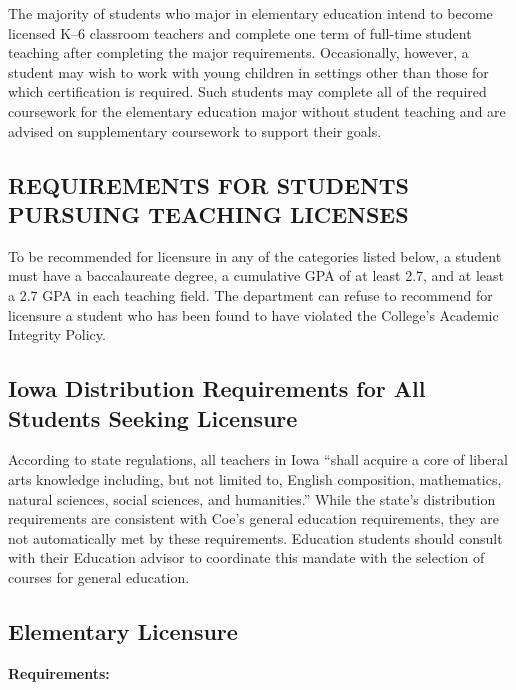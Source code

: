 \documentclass[
  letterpaper,
]{scrbook}
\begin{document}
The majority of students who major in elementary education intend to
become licensed K--6 classroom teachers and complete one term of
full-time student teaching after completing the major requirements.
Occasionally, however, a student may wish to work with young children in
settings other than those for which certification is required. Such
students may complete all of the required coursework for the elementary
education major without student teaching and are advised on
supplementary coursework to support their goals.

\subsection{REQUIREMENTS FOR STUDENTS PURSUING TEACHING
LICENSES}\label{requirements-for-students-pursuing-teaching-licenses}

To be recommended for licensure in any of the categories listed below, a
student must have a baccalaureate degree, a cumulative GPA of at least
2.7, and at least a 2.7 GPA in each teaching field. The department can
refuse to recommend for licensure a student who has been found to have
violated the College's Academic Integrity Policy.

\subsection{Iowa Distribution Requirements for All Students Seeking
Licensure}\label{iowa-distribution-requirements-for-all-students-seeking-licensure}

According to state regulations, all teachers in Iowa ``shall acquire a
core of liberal arts knowledge including, but not limited to, English
composition, mathematics, natural sciences, social sciences, and
humanities.'' While the state's distribution requirements are consistent
with Coe's general education requirements, they are not automatically
met by these requirements. Education students should consult with their
Education advisor to coordinate this mandate with the selection of
courses for general education.

\subsection{Elementary Licensure}\label{elementary-licensure}

\textbf{Requirements:}
\end{document}
